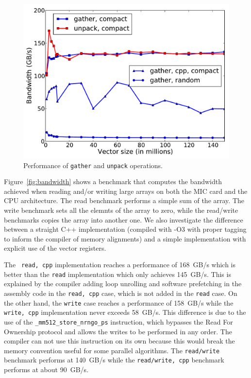\documentclass[10pt,conference,compsocconf]{IEEEtran}
\begin{document}
\begin{figure}[t]
  \centering
  \includegraphics[width=.9\linewidth]{figures/bandwidth_gather_unpack.pdf}
  \caption{Performance of {\tt gather} and {\tt unpack} operations.}
  \label{fig:band_gather} 
\end{figure}


Figure~\ref{fig:bandwidth} shows a benchmark that computes the
bandwidth achieved when reading and/or writing large arrays on both
the MIC card and the CPU architecture. The read benchmark performs a
simple sum of the array. The write benchmark sets all the elemnts of
the array to zero, while the read/write benchmarks copies the array into
another one. We also investigate the difference between a straight C++
implementation (compiled with -O3 with proper tagging to inform the
compiler of memory alignments) and a simple implementation with
explicit use of the vector registers.

The {\tt
  read, cpp} implementation reaches a performance of 168~GB/s
 which is better than the {\tt read}
implementation which only achieves 145~GB/s. This
is explained by the compiler adding loop unrolling and software
prefetching in the assembly code in the {\tt read, cpp} case, which is
not added in the {\tt read} case. On the other hand, the {\tt write}
case reaches a performance of 158~GB/s while the
{\tt write, cpp} implementation never exceeds 58~GB/s. 
This difference is due to the use of the {\tt \_mm512\_store\_nrngo\_ps} instruction, 
which bypasses the Read For Ownership protocol and allows the writes
to be performed in any order. The compiler can not use this
instruction on its own because this would break the memory convention
useful for some parallel algorithms. The {\tt read/write} benchmark
performs at 140~GB/s while the {\tt read/write, cpp} benchmark performs
at about 90~GB/s.
\end{document}
